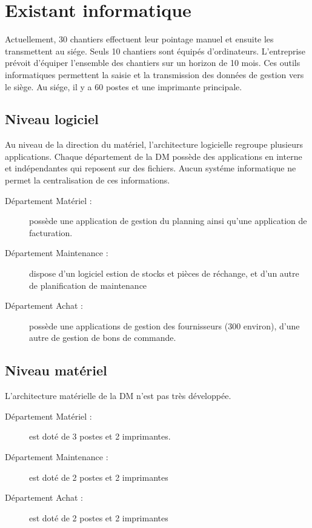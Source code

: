 
\section{Existant informatique}

		Actuellement, 30 chantiers effectuent leur pointage manuel et ensuite les transmettent au siége. Seuls 10
chantiers sont équipés d'ordinateurs. L'entreprise prévoit d'équiper l'ensemble des chantiers sur un horizon de 10 mois. 
Ces outils informatiques permettent la saisie et la transmission des données de gestion vers le siège.
		Au siége, il y a 60 postes et une imprimante principale.
		
		\subsection{Niveau logiciel}
		
		Au niveau de la direction du matériel, l'architecture logicielle regroupe plusieurs applications.
Chaque département de la DM possède des applications en interne et indépendantes qui reposent sur des fichiers. Aucun systéme informatique
ne permet la centralisation de ces informations.

		\begin{description}
			\item[Département Matériel :] possède une application de gestion du planning ainsi qu'une application de facturation.
			\item[Département Maintenance :] dispose d'un logiciel estion de stocks et pièces de réchange, et d'un autre de planification de maintenance
			\item[Département Achat :] possède une applications de gestion des fournisseurs (300 environ), d'une autre de gestion de bons de commande.
		\end{description}


		\subsection{Niveau matériel}

		 L'architecture matérielle de la DM n'est pas très développée.

		\begin{description}
			\item[Département Matériel :] est doté de 3 postes et 2 imprimantes.
			\item[Département Maintenance :] est doté de 2 postes et 2 imprimantes
			\item[Département Achat :] est doté de 2 postes et 2 imprimantes
		\end{description}
		
